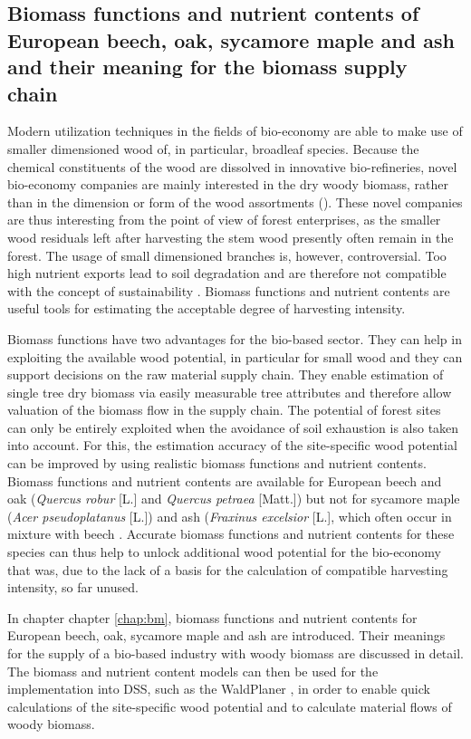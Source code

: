 \subsection{Biomass functions and nutrient contents of European beech, oak, sycamore maple and ash and their meaning for the biomass supply chain}
\label{subsec:intro:struct:bm}
Modern utilization techniques in the fields of bio-economy are able to make use of smaller dimensioned wood of, in particular, broadleaf species. Because the chemical constituents of the wood are dissolved in innovative bio-refineries, novel bio-economy companies are mainly interested in the dry woody biomass, rather than in the dimension or form of the wood assortments (\citep{ekman_2013}). These novel companies are thus interesting from the point of view of forest enterprises, as the smaller wood residuals left after harvesting the stem wood presently often remain in the forest. The usage of small dimensioned branches is, however, controversial. Too high nutrient exports lead to soil degradation and are therefore not compatible with the concept of sustainability \citep[p. 261]{pretzsch_2014}. Biomass functions and nutrient contents are useful tools for estimating the acceptable degree of harvesting intensity.

Biomass functions have two advantages for the bio-based sector. They can help in exploiting the available wood potential, in particular for small wood and they can support decisions on the raw material supply chain. They enable estimation of single tree dry biomass via easily measurable tree attributes and therefore allow valuation of the biomass flow in the supply chain. The potential of forest sites can only be entirely exploited when the avoidance of soil exhaustion is also taken into account. For this, the estimation accuracy of the site-specific wood potential can be improved by using realistic biomass functions and nutrient contents. Biomass functions and nutrient contents are available for European beech and oak (\textit{Quercus robur} [L.] and \textit{Quercus petraea} [Matt.]) but not for sycamore maple (\textit{Acer pseudoplatanus} [L.]) and ash (\textit{Fraxinus excelsior} [L.], which often occur in mixture with beech \citep{ti_2014}. Accurate biomass functions and nutrient contents for these species can thus help to unlock additional wood potential for the bio-economy that was, due to the lack of a basis for the calculation of compatible harvesting intensity, so far unused.

In chapter chapter \ref{chap:bm}, biomass functions and nutrient contents for European beech, oak, sycamore maple and ash are introduced. Their meanings for the supply of a bio-based industry with woody biomass are discussed in detail. The biomass and nutrient content models can then be used for the implementation into DSS, such as the WaldPlaner \citep{hansen_2014}, in order to enable quick calculations of the site-specific wood potential and to calculate material flows of woody biomass.

